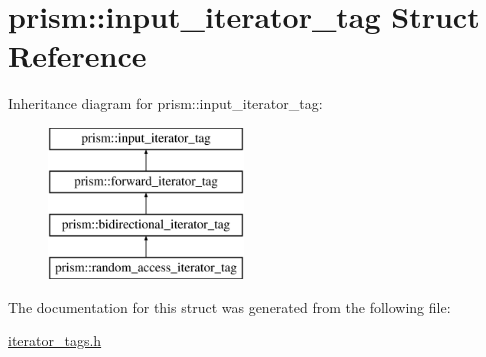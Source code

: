 \hypertarget{structprism_1_1input__iterator__tag}{}\section{prism\+:\+:input\+\_\+iterator\+\_\+tag Struct Reference}
\label{structprism_1_1input__iterator__tag}
Inheritance diagram for prism\+:\+:input\+\_\+iterator\+\_\+tag\+:\begin{figure}[H]
\begin{center}
\leavevmode
\includegraphics[height=4.000000cm]{structprism_1_1input__iterator__tag}
\end{center}
\end{figure}


The documentation for this struct was generated from the following file\+:\begin{DoxyCompactItemize}
\item 
\hyperlink{iterator__tags_8h}{iterator\+\_\+tags.\+h}\end{DoxyCompactItemize}
